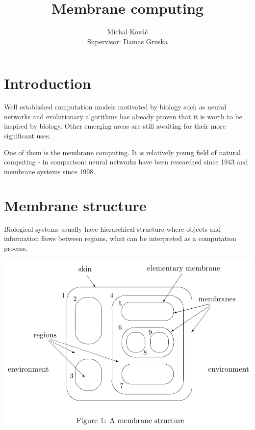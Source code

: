 \documentclass[myposter,portrait]{sciposter}
\def\mysection#1{
{\color{sectionCol}\section*{\sc\bfseries #1}}}
\begin{document}
\setlength{\logowidth}{20cm}
\setlength{\titlewidth}{\textwidth}
\addtolength{\titlewidth}{-\logowidth}
\useleftlogofalse

\color{textCol}

\title{Membrane computing}
\author{Michal Kováč\\
        Supervisor: Damas Gruska}
\maketitle

\begin{multicols*}{3}

\mysection{Introduction}
Well established computation models motivated by biology such as neural networks and evolutionary algorithms has already proven that it is worth to be inspired by biology. Other emerging areas are still awaiting for their more significant uses.

One of them is the membrane computing. It is relatively young field of natural computing - in comparison: neural networks have been researched since 1943 and membrane systems since 1998\cite{Paun98}.

\mysection{Membrane structure}

Biological systems usually have hierarchical structure where objects and information flows between regions, what can be interpreted as a computation process.

\includegraphics[width=\columnwidth]{membrane_structure}


\end{multicols*}
\end{document}
